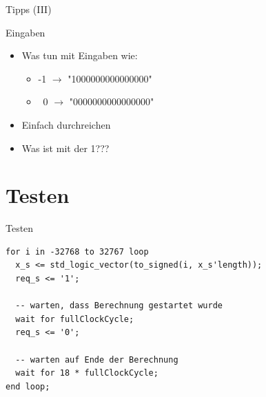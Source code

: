   \begin{frame} {Tipps (III)}
    \begin{block} {Eingaben}
      \begin{itemize}
        \item Was tun mit Eingaben wie:
        \begin{itemize}
          \item -1 $\rightarrow$ "1000000000000000"
          \item ~0 $\rightarrow$ "0000000000000000"
        \end{itemize}
        \pause
        \item[] Einfach durchreichen
        \item Was ist mit der 1??? 
      \end{itemize}	
    \end{block}
  \end{frame}


  \section{Testen}
  \begin{frame} [fragile] {Testen}
    \begin{lstlisting}
for i in -32768 to 32767 loop
  x_s <= std_logic_vector(to_signed(i, x_s'length));
  req_s <= '1'; 

  -- warten, dass Berechnung gestartet wurde
  wait for fullClockCycle;
  req_s <= '0';

  -- warten auf Ende der Berechnung
  wait for 18 * fullClockCycle;
end loop;
    \end{lstlisting}
  \end{frame}

